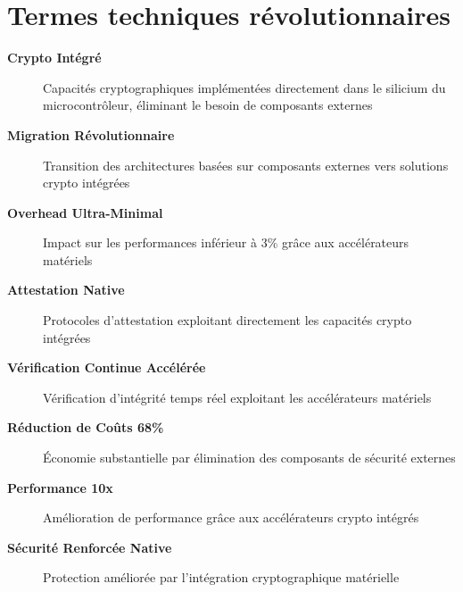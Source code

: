 \section*{Termes techniques révolutionnaires}

\begin{description}
    \item[\textbf{Crypto Intégré}] Capacités cryptographiques implémentées directement dans le silicium du microcontrôleur, éliminant le besoin de composants externes
    \item[\textbf{Migration Révolutionnaire}] Transition des architectures basées sur composants externes vers solutions crypto intégrées
    \item[\textbf{Overhead Ultra-Minimal}] Impact sur les performances inférieur à 3\% grâce aux accélérateurs matériels
    \item[\textbf{Attestation Native}] Protocoles d'attestation exploitant directement les capacités crypto intégrées
    \item[\textbf{Vérification Continue Accélérée}] Vérification d'intégrité temps réel exploitant les accélérateurs matériels
    \item[\textbf{Réduction de Coûts 68\%}] Économie substantielle par élimination des composants de sécurité externes
    \item[\textbf{Performance 10x}] Amélioration de performance grâce aux accélérateurs crypto intégrés
    \item[\textbf{Sécurité Renforcée Native}] Protection améliorée par l'intégration cryptographique matérielle
\end{description}